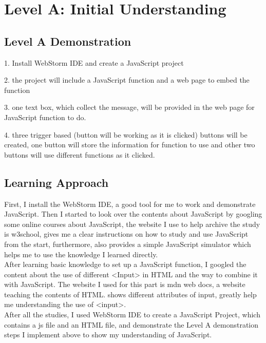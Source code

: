 \documentclass[a4paper, 11pt]{report}
\begin{document}

\newpage
\section{Level A: Initial Understanding}
\vspace{5mm}
\subsection{Level A Demonstration}

1. Install WebStorm IDE and create a JavaScript project

2. the project will include a JavaScript function and a web page to embed the function 

3. one text box, which collect the message, will be provided in the web page for JavaScript function to do.

4. three trigger based (button will be working as it is clicked) buttons will be created, one button will store 
the information for function to use and other two buttons will use different functions as it clicked.

\subsection{Learning Approach}

First, I install the WebStorm IDE, a good tool for me to work and demonstrate JavaScript. 
Then I started to look over the contents about JavaScript by googling some online courses about JavaScript,  
the website I use to help 
archive the study is w3school, \cite{w3school} gives me a clear instructions on how to study and use JavaScript 
from the start, furthermore, \cite{w3school} also provides a simple JavaScript simulator which helps me to use 
the knowledge I learned directly. 
\\

After learning basic knowledge to set up a JavaScript function, I googled the content about the use of different 
<Input> in HTML and the way to combine it with JavaScript. The website I used for this part is mdn web docs, a 
website teaching the contents of HTML. \cite{input} shows different attributes of input, greatly help me 
understanding the use of <input>. 
\\

After all the studies, I used WebStorm IDE to create a JavaScript Project, which contains a js file and an HTML 
file, and demonstrate the Level A demonstration steps I implement above to show my understanding of JavaScript.
\end{document}
